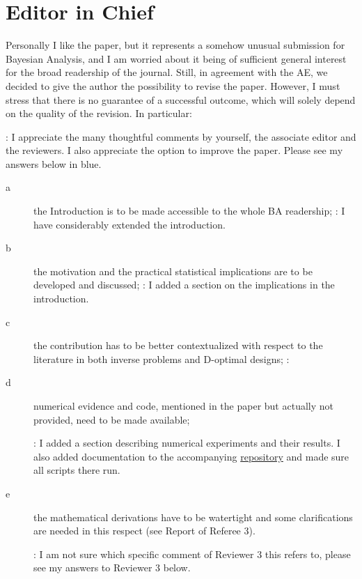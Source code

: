 \documentclass{amsart}
\begin{document}
\section{Editor in Chief}
Personally I like the paper, but it represents a somehow unusual
submission for Bayesian Analysis, and I am worried about it being of
sufficient general interest for the broad readership of the
journal. Still, in agreement with the AE, we decided to give the
author the possibility to revise the paper. However, I must stress
that there is no guarantee of a successful outcome, which will solely
depend on the quality of the revision. In particular:

\answer: I appreciate the many thoughtful comments by yourself, the
associate editor and the reviewers. I also appreciate the option to
improve the paper. Please see my answers below in blue.

\begin{description}
  \item[a] the Introduction is to be made accessible to the whole BA
    readership;
    \answer: I have considerably extended the introduction.
    
  \item[b] the motivation and the practical statistical implications are to be
    developed and discussed;
    \answer: I added a section on the implications in the introduction.
    
  \item[c] the contribution has to be better contextualized with
    respect to the literature in both inverse problems and D-optimal
    designs;
  \answer: 
    
  \item[d] numerical evidence and code, mentioned in the paper but
    actually not provided, need to be made available;

    \answer: I added a section describing numerical experiments and
    their results. I also added documentation to the accompanying
    \href{https://github.com/yairdaon/OED}{repository} and made sure
    all scripts there run.
    
  \item[e] the mathematical derivations have to be watertight and some
    clarifications are needed in this respect (see Report of Referee
    3).

    \answer: I am not sure which specific comment of Reviewer 3 this
    refers to, please see my answers to Reviewer 3 below.
\end{description}
\end{document}
